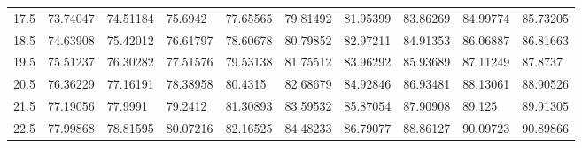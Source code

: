 \documentclass[10pt,twocolumn,letterpaper]{article}
\begin{document}
\begin{table}
\begin{tabular}{llllllllll}
    17.5            & 73.74047                               & 74.51184                               & 75.6942                                 & 77.65565                                & 79.81492                                & 81.95399                                & 83.86269                                & 84.99774                                & 85.73205                                \\
    18.5            & 74.63908                               & 75.42012                               & 76.61797                                & 78.60678                                & 80.79852                                & 82.97211                                & 84.91353                                & 86.06887                                & 86.81663                                \\
    19.5            & 75.51237                               & 76.30282                               & 77.51576                                & 79.53138                                & 81.75512                                & 83.96292                                & 85.93689                                & 87.11249                                & 87.8737                                 \\
    20.5            & 76.36229                               & 77.16191                               & 78.38958                                & 80.4315                                 & 82.68679                                & 84.92846                                & 86.93481                                & 88.13061                                & 88.90526                                \\
    21.5            & 77.19056                               & 77.9991                                & 79.2412                                 & 81.30893                                & 83.59532                                & 85.87054                                & 87.90908                                & 89.125                                  & 89.91305                                \\
    22.5            & 77.99868                               & 78.81595                               & 80.07216                                & 82.16525                                & 84.48233                                & 86.79077                                & 88.86127                                & 90.09723                                & 90.89866                                \\

\end{tabular}
\end{table}
\end{document}
